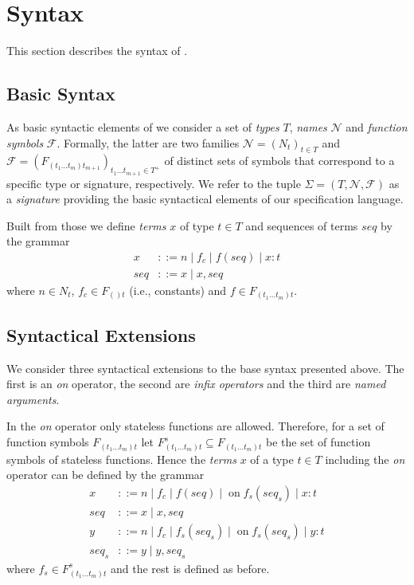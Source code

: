 \section{Syntax}

This section describes the syntax of \tessla.

\subsection{Basic Syntax}

As basic syntactic elements of \tessla we consider a set of \emph{types} $T$, \emph{names} $\mathcal{N}$ and \emph{function symbols} $\mathcal{F}$.
Formally, the latter are two families $\mathcal{N}=(N_t)_{t \in T}$ and $\mathcal{F}=(F_{(t_1…t_m)t_{m+1}})_{t_1…t_{m+1} \in T^+}$ of distinct sets of symbols that correspond to a specific type or signature, respectively.
We refer to the tuple $Σ=(T,\mathcal{N}, \mathcal{F})$ as a \emph{signature} providing the basic syntactical elements of our specification language.

Built from those we define \emph{terms} $x$ of type $t \in T$ and sequences of terms $seq$ by the grammar
\[\begin{array}{rl}
x &::= n \mid f_c \mid f(seq) \mid x : t\\
seq &::= x \mid x,seq
\end{array}\]
where $n \in N_t$, $f_c \in F_{()t}$ (i.e., constants) and $f \in F_{(t_1…t_m)t}$.

\subsection{Syntactical Extensions}

We consider three syntactical extensions to the base syntax presented above. The first is an \emph{on} operator, the second are \emph{infix operators} and the third are \emph{named arguments}.

In the \emph{on} operator only stateless functions are allowed. Therefore, for a set of function symbols $F_{(t_1…t_m)t}$ let $F^s_{(t_1…t_m)t} \subseteq F_{(t_1…t_m)t}$ be the set of function symbols of stateless functions. Hence the \emph{terms} $x$ of a type $t \in T$ including the \emph{on} operator can be defined by the grammar
\[\begin{array}{rl}
x &::= n \mid f_c \mid f(seq) \mid \operatorname{on} f_s(seq_s) \mid x : t\\
seq &::= x \mid x,seq \\
y &::= n \mid f_c \mid f_s(seq_s) \mid \operatorname{on} f_s(seq_s) \mid y : t \\
seq_s &::= y \mid y,seq_s
\end{array}\]
where $f_s \in F^s_{(t_1…t_m)t}$ and the rest is defined as before.

